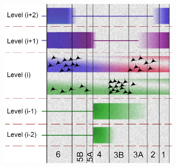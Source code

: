 \begin{figure}[!ht]
	\centering
	\includegraphics[width=0.8\textwidth, clip=true]{./Chapters/01_Introduction/Images/LaminarProcessing}
	\caption{\cite{Shipp2013} }
	\label{fig:layerprocessing}
\end{figure}
